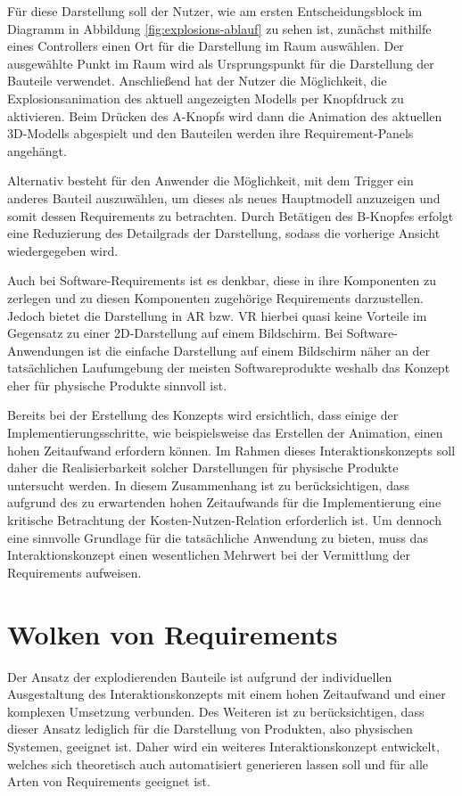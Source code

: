 Für diese Darstellung soll der Nutzer, wie am ersten Entscheidungsblock im Diagramm in Abbildung \ref{fig:explosions-ablauf} zu sehen ist, zunächst mithilfe eines Controllers einen Ort für die Darstellung im Raum auswählen.
Der ausgewählte Punkt im Raum wird als Ursprungspunkt für die Darstellung der Bauteile verwendet.
Anschließend hat der Nutzer die Möglichkeit, die Explosionsanimation des aktuell angezeigten Modells per Knopfdruck zu aktivieren.
Beim Drücken des A-Knopfs wird dann die Animation des aktuellen 3D-Modells abgespielt und den Bauteilen werden ihre Requirement-Panels angehängt.

Alternativ besteht für den Anwender die Möglichkeit, mit dem Trigger ein anderes Bauteil auszuwählen, um dieses als neues Hauptmodell anzuzeigen und somit dessen Requirements zu betrachten.
Durch Betätigen des B-Knopfes erfolgt eine Reduzierung des Detailgrads der Darstellung, sodass die vorherige Ansicht wiedergegeben wird.

Auch bei Software-Requirements ist es denkbar, diese in ihre Komponenten zu zerlegen und zu diesen Komponenten zugehörige Requirements darzustellen.
Jedoch bietet die Darstellung in AR bzw. VR hierbei quasi keine Vorteile im Gegensatz zu einer 2D-Darstellung auf einem Bildschirm.
Bei Software-Anwendungen ist die einfache Darstellung auf einem Bildschirm näher an der tatsächlichen Laufumgebung der meisten Softwareprodukte weshalb das Konzept eher für physische Produkte sinnvoll ist.

Bereits bei der Erstellung des Konzepts wird ersichtlich, dass einige der Implementierungsschritte, wie beispielsweise das Erstellen der Animation, einen hohen Zeitaufwand erfordern können.
Im Rahmen dieses Interaktionskonzepts soll daher die Realisierbarkeit solcher Darstellungen für physische Produkte untersucht werden.
In diesem Zusammenhang ist zu berücksichtigen, dass aufgrund des zu erwartenden hohen Zeitaufwands für die Implementierung eine kritische Betrachtung der Kosten-Nutzen-Relation erforderlich ist.
Um dennoch eine sinnvolle Grundlage für die tatsächliche Anwendung zu bieten, muss das Interaktionskonzept einen wesentlichen Mehrwert bei der Vermittlung der Requirements aufweisen.

\newpage
\section{Wolken von Requirements}

Der Ansatz der explodierenden Bauteile ist aufgrund der individuellen Ausgestaltung des Interaktionskonzepts mit einem hohen Zeitaufwand und einer komplexen Umsetzung verbunden.
Des Weiteren ist zu berücksichtigen, dass dieser Ansatz lediglich für die Darstellung von Produkten, also physischen Systemen, geeignet ist.
Daher wird ein weiteres Interaktionskonzept entwickelt, welches sich theoretisch auch automatisiert generieren lassen soll und für alle Arten von Requirements geeignet ist.

